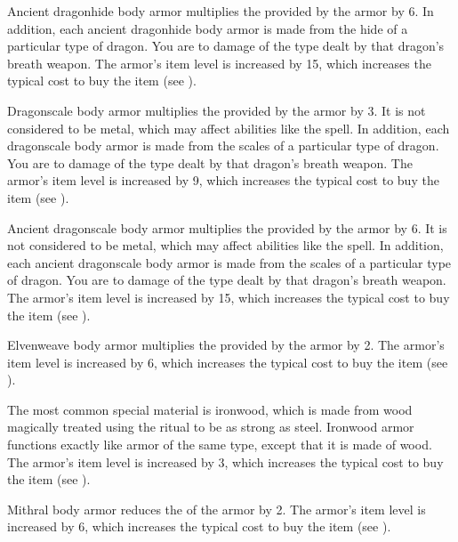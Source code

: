          Ancient dragonhide body armor multiplies the  provided by the armor by 6.
        In addition, each ancient dragonhide body armor is made from the hide of a particular type of dragon.
        You are  to damage of the type dealt by that dragon's breath weapon.
        The armor's item level is increased by 15, which increases the typical cost to buy the item (see ).

         Dragonscale body armor multiplies the  provided by the armor by 3.
        It is not considered to be metal, which may affect abilities like the  spell.
        In addition, each dragonscale body armor is made from the scales of a particular type of dragon.
        You are  to damage of the type dealt by that dragon's breath weapon.
        The armor's item level is increased by 9, which increases the typical cost to buy the item (see ).

         Ancient dragonscale body armor multiplies the  provided by the armor by 6.
        It is not considered to be metal, which may affect abilities like the  spell.
        In addition, each ancient dragonscale body armor is made from the scales of a particular type of dragon.
        You are  to damage of the type dealt by that dragon's breath weapon.
        The armor's item level is increased by 15, which increases the typical cost to buy the item (see ).

         Elvenweave body armor multiplies the  provided by the armor by 2.
        The armor's item level is increased by 6, which increases the typical cost to buy the item (see ).

         The most common special material is ironwood, which is made from wood magically treated using the  ritual to be as strong as steel. Ironwood armor functions exactly like armor of the same type, except that it is made of wood.
        The armor's item level is increased by 3, which increases the typical cost to buy the item (see ).

         Mithral body armor reduces the  of the armor by 2.
        The armor's item level is increased by 6, which increases the typical cost to buy the item (see ).


